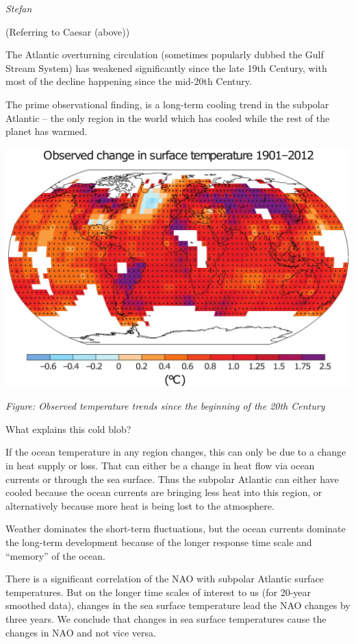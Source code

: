 \documentclass[
]{book}
\begin{document}
\emph{Stefan}

(Referring to Caesar (above))

The Atlantic overturning circulation (sometimes popularly dubbed the Gulf Stream System) has weakened significantly since the late 19th Century, with most of the decline happening since the mid-20th Century.

The prime observational finding, is a long-term cooling trend in the subpolar Atlantic -- the only region in the world which has cooled while the rest of the planet has warmed.

\includegraphics{fig/North_Atlantic_CoolinG_AR5-Fig-SPM1.jpg}

\emph{Figure: Observed temperature trends since the beginning of the 20th Century}

What explains this cold blob?

If the ocean temperature in any region changes, this can only be due to a change in heat supply or loss. That can either be a change in heat flow via ocean currents or through the sea surface. Thus the subpolar Atlantic can either have cooled because the ocean currents are bringing less heat into this region, or alternatively because more heat is being lost to the atmosphere.

Weather dominates the short-term fluctuations, but the ocean currents dominate the long-term development because of the longer response time scale and ``memory'' of the ocean.

There is a significant correlation of the NAO with subpolar Atlantic surface temperatures. But on the longer time scales of interest to us (for 20-year smoothed data), changes in the sea surface temperature lead the NAO changes by three years. We conclude that changes in sea surface temperatures cause the changes in NAO and not vice versa.
\end{document}
